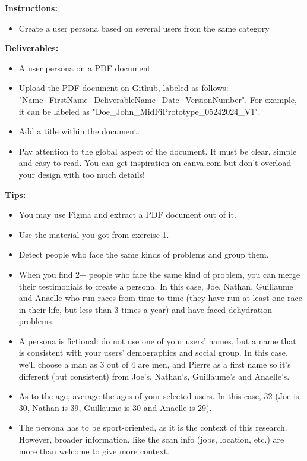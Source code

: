 \makeheaderfiles

\textbf{Instructions:}

\begin{itemize}
\item Create a user persona based on several users from the same category
\end{itemize}

\textbf{Deliverables:}

\begin{itemize}
\item A user persona on a PDF document
\item Upload the PDF document on Github, labeled as follows: "Name\_FirstName\_DeliverableName\_Date\_VersionNumber". For example, it can be labeled as "Doe\_John\_MidFiPrototype\_05242024\_V1".
\item Add a title within the document.
\item Pay attention to the global aspect of the document. It must be clear, simple and easy to read. You can get inspiration on canva.com but don't overload your design with too much details!
\end{itemize}

\textbf{Tips:}

\begin{itemize}
\item You may use Figma and extract a PDF document out of it.
\item Use the material you got from exercise 1.
\item Detect people who face the same kinds of problems and group them. 
\item When you find 2+ people who face the same kind of problem, you can merge their testimonials to create a persona. In this case, Joe, Nathan, Guillaume and Anaelle who run races from time to time (they have run at least one race in their life, but less than 3 times a year) and have faced dehydration problems. 
\item A persona is fictional: do not use one of your users' names, but a name that is consistent with your users' demographics and social group. In this case, we'll choose a man as 3 out of 4 are men, and Pierre as a first name so it's different (but consistent) from Joe's, Nathan's, Guillaume's and Anaelle's.
\item As to the age, average the ages of your selected users. In this case, 32 (Joe is 30, Nathan is 39, Guillaume is 30 and Anaelle is 29).
\item The persona has to be sport-oriented, as it is the context of this research. However, broader information, like the scan info (jobs, location, etc.) are more than welcome to give more context.
\end{itemize}


